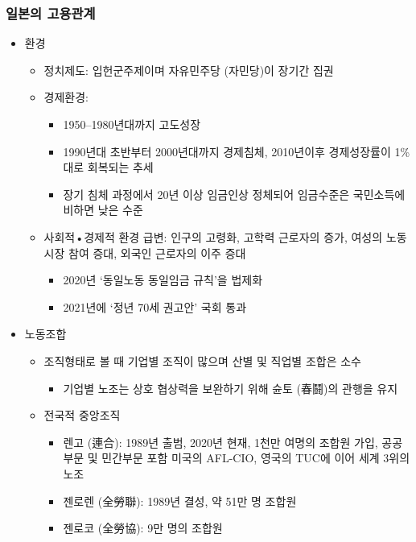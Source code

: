 \documentclass[aspectratio=169,xcolor=dvipsnames,handout]{beamer}
\begin{document}
\begin{frame}[allowframebreaks]
    \frametitle{일본의 고용관계}
    \begin{itemize}[<+->]
        \item 환경
        \begin{itemize}
            \item 정치제도: 입헌군주제이며 자유민주당 (자민당)이 장기간 집권
            \item 경제환경:  
            \begin{itemize}
               \item 1950--1980년대까지 고도성장
               \item 1990년대 초반부터 2000년대까지 경제침체, 2010년이후 경제성장률이 1\%대로 회복되는 추세
               \item 장기 침체 과정에서 20년 이상 임금인상 정체되어 임금수준은 국민소득에 비하면 낮은 수준
            \end{itemize}
            \item 사회적•경제적 환경 급변: 인구의 고령화, 고학력 근로자의 증가, 여성의 노동시장 참여 증대, 외국인 근로자의 이주 증대
            \begin{itemize}
               \item 2020년 `동일노동 동일임금 규칙'을 법제화
               \item 2021년에 `정년 70세 권고안' 국회 통과
            \end{itemize}
        \end{itemize}
    \framebreak%
        \item 노동조합
        \begin{itemize}
            \item 조직형태로 볼 때 기업별 조직이 많으며 산별 및 직업별 조합은 소수
            \begin{itemize}
                \item 기업별 노조는 상호 협상력을 보완하기 위해 슌토 (春鬪)의 관행을 유지 
            \end{itemize}
            \item 전국적 중앙조직
            \begin{itemize}
                \item 렌고 (連合): 1989년 출범, 2020년 현재, 1천만 여명의 조합원 가입, 공공부문 및 민간부문 포함 미국의 AFL-CIO, 영국의 TUC에 이어 세계 3위의 노조
                \item 젠로렌 (全勞聯): 1989년 결성, 약 51만 명 조합원 
                \item 젠로코 (全勞協): 9만 명의 조합원

\end{itemize}
\end{itemize}
\end{itemize}
\end{frame}
\end{document}
